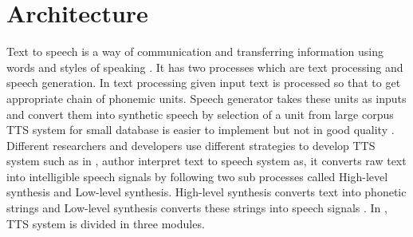 \section{Architecture}
Text to speech is a way of communication and transferring information using words and styles of
speaking \cite{eide2004corpus}. It has two processes which are text processing and speech
generation. In text processing given input text is processed so that to get appropriate chain of
phonemic units. Speech generator takes these units as inputs and convert them into synthetic
speech by selection of a unit from large corpus TTS system for small database is easier to
implement but not in good quality \cite{black2007statistical} \cite{zen2007hmm} \cite{raj2007text}.
Different researchers and developers use different strategies to develop TTS system such as in \cite{kabir2002natural}, 
author interpret text to speech system as, it converts raw text into intelligible speech signals
by following two sub processes called High-level synthesis and Low-level synthesis. High-level
synthesis converts text into phonetic strings and Low-level synthesis converts these strings into
speech signals \cite{kabir2002natural}. In \cite{hussain2005phonological}, TTS system is divided in three modules.

